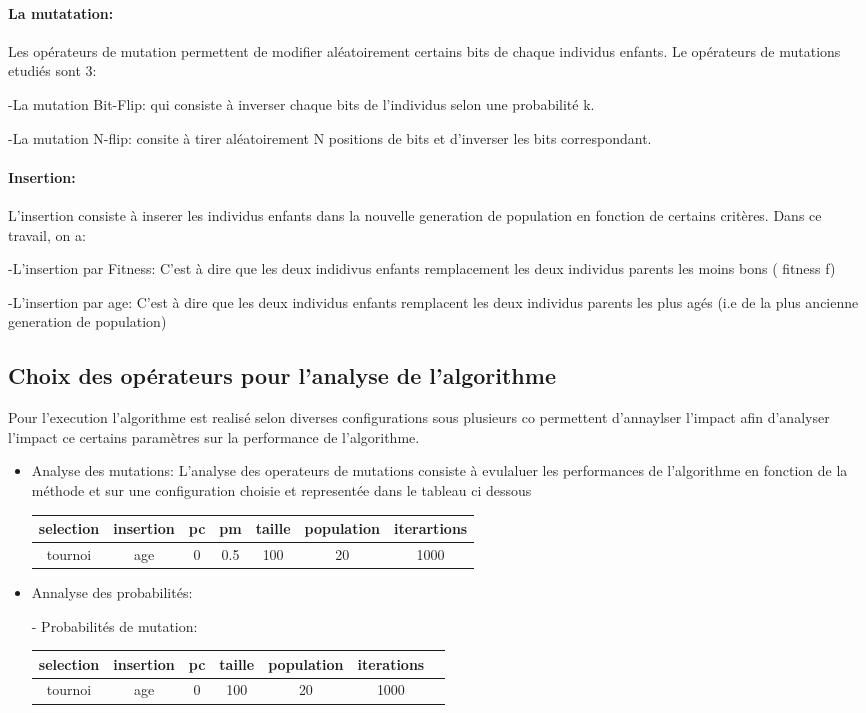 \documentclass{article}
\begin{document}
\paragraph{ La mutatation:}
Les opérateurs de mutation permettent de modifier aléatoirement certains bits de chaque individus enfants. Le opérateurs de mutations etudiés sont 3:

-La mutation Bit-Flip: qui consiste à inverser chaque bits de l'individus selon une probabilité k.

-La mutation N-flip: consite à tirer aléatoirement N positions de bits et d'inverser les bits correspondant.

\paragraph{Insertion:}
L'insertion consiste à inserer les individus enfants dans la nouvelle generation de population en fonction de certains critères. Dans ce travail, on a:

-L'insertion par Fitness: C'est à dire que les deux indidivus enfants remplacement les deux individus parents les moins bons ( fitness f)

-L'insertion par age: C'est à dire que les deux individus enfants remplacent les deux individus parents les plus agés (i.e de la plus ancienne generation de population)

\subsection{Choix des opérateurs pour l'analyse de l'algorithme}
Pour l'execution l'algorithme est realisé selon diverses configurations sous plusieurs co permettent d'annaylser l'impact afin d'analyser l'impact ce certains paramètres sur la performance de l'algorithme.

\begin{itemize}
    \item Analyse des mutations: L'analyse des operateurs de mutations consiste à evulaluer les performances de l'algorithme en fonction de la méthode et sur une configuration choisie et representée dans le tableau ci dessous
    
    \begin{tabular}{|c|c|c|c|c|c|c|}
    \hline
    selection & insertion & pc & pm & taille & population & iterartions \\
    \hline
    tournoi & age & 0 & 0.5 & 100 & 20 & 1000\\
    \hline
    \end{tabular}
    
    \item Annalyse des probabilités:
     
     - Probabilités de mutation:
     
    \begin{tabular}{|c|c|c|c|c|c|c|}
    \hline
    selection & insertion & pc & taille & population & iterations \\
    \hline
    tournoi & age & 0 & 100 & 20 & 1000\\
    \hline
    \end{tabular}
        
\end{itemize}
\end{document}
